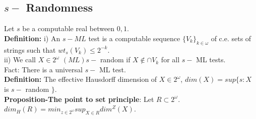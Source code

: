 \documentclass{article}
\begin{document}
   \subsection{$s-$ Randomness }
   Let $s$ be a computable real between $0,1$. \\
   \textbf{Definition:} i) An $s-ML$ test is a computable sequence $\{V_k\}_{k \in \omega}$ of c.e. sets of strings such that $wt_s(V_k) \leq 2^{-k}$. \\
   ii) We call $X \in 2^\omega$ $(ML) s-$ random if $X \not \in \cap V_k$ for all $s-$ ML tests.
   \\Fact: There is a universal $s-$ ML test. \\
   \textbf{Definition:} The effective Hausdorff dimension of $X \in 2^\omega$, $dim(X) = sup \{s : X $ is $s-$ random $\}$.\\
   \textbf{Proposition-The point to set principle}: Let $R \subset 2^\omega$. \\ $dim_H(R) = min_{z \in 2^\omega} sup_{X \in R} dim^Z(X)$.
   
\end{document}
